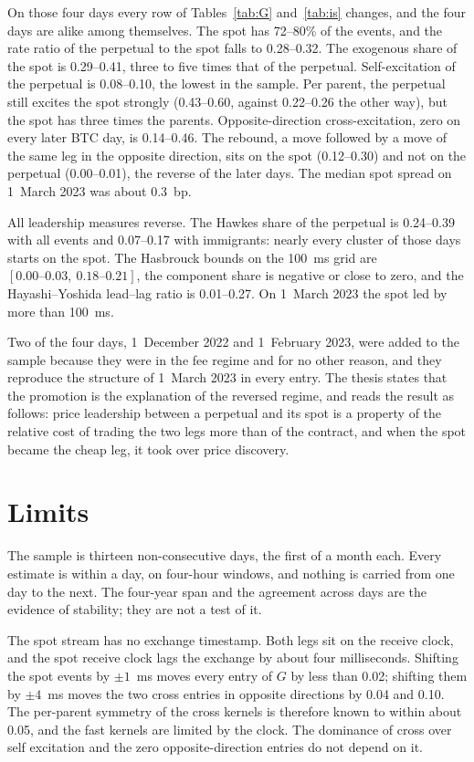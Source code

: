 \documentclass[a4paper,11pt]{article}
\begin{document}
On those four days every row of Tables~\ref{tab:G} and~\ref{tab:is} changes, and the four days are alike among themselves. The spot has 72--80\% of the events, and the rate ratio of the perpetual to the spot falls to 0.28--0.32. The exogenous share of the spot is 0.29--0.41, three to five times that of the perpetual. Self-excitation of the perpetual is 0.08--0.10, the lowest in the sample. Per parent, the perpetual still excites the spot strongly (0.43--0.60, against 0.22--0.26 the other way), but the spot has three times the parents. Opposite-direction cross-excitation, zero on every later BTC day, is 0.14--0.46. The rebound, a move followed by a move of the same leg in the opposite direction, sits on the spot (0.12--0.30) and not on the perpetual (0.00--0.01), the reverse of the later days. The median spot spread on 1~March 2023 was about 0.3~bp.

All leadership measures reverse. The Hawkes share of the perpetual is 0.24--0.39 with all events and 0.07--0.17 with immigrants: nearly every cluster of those days starts on the spot. The Hasbrouck bounds on the 100~ms grid are $[0.00\text{--}0.03,\ 0.18\text{--}0.21]$, the component share is negative or close to zero, and the Hayashi--Yoshida lead--lag ratio is 0.01--0.27. On 1~March 2023 the spot led by more than 100~ms.

Two of the four days, 1~December 2022 and 1~February 2023, were added to the sample because they were in the fee regime and for no other reason, and they reproduce the structure of 1~March 2023 in every entry. The thesis states that the promotion is the explanation of the reversed regime, and reads the result as follows: price leadership between a perpetual and its spot is a property of the relative cost of trading the two legs more than of the contract, and when the spot became the cheap leg, it took over price discovery.

\section{Limits}\label{sec:limits}

The sample is thirteen non-consecutive days, the first of a month each. Every estimate is within a day, on four-hour windows, and nothing is carried from one day to the next. The four-year span and the agreement across days are the evidence of stability; they are not a test of it.

The spot stream has no exchange timestamp. Both legs sit on the receive clock, and the spot receive clock lags the exchange by about four milliseconds. Shifting the spot events by $\pm1$~ms moves every entry of $G$ by less than 0.02; shifting them by $\pm4$~ms moves the two cross entries in opposite directions by 0.04 and 0.10. The per-parent symmetry of the cross kernels is therefore known to within about 0.05, and the fast kernels are limited by the clock. The dominance of cross over self excitation and the zero opposite-direction entries do not depend on it.
\end{document}
